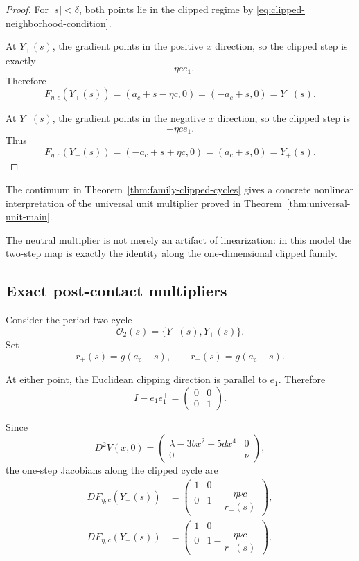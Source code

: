 \begin{proof}
For $|s|<\delta$,
both points lie in the clipped regime by
\eqref{eq:clipped-neighborhood-condition}.

At $Y_+(s)$, the gradient points in the positive $x$ direction, so
the clipped step is exactly
\[
-\eta c e_1.
\]
Therefore
\[
F_{\eta,c}(Y_+(s))
=
(a_c+s-\eta c,0)
=
(-a_c+s,0)
=
Y_-(s).
\]

At $Y_-(s)$, the gradient points in the negative $x$ direction, so
the clipped step is
\[
+\eta c e_1.
\]
Thus
\[
F_{\eta,c}(Y_-(s))
=
(-a_c+s+\eta c,0)
=
(a_c+s,0)
=
Y_+(s).
\]
\end{proof}

\begin{remark}
\label{rem:family-unit-meaning}
The continuum in
Theorem~\ref{thm:family-clipped-cycles} gives a concrete nonlinear
interpretation of the universal unit multiplier proved in
Theorem~\ref{thm:universal-unit-main}.

The neutral multiplier is not merely an artifact of linearization:
in this model the two-step map is exactly the identity along the
one-dimensional clipped family.
\end{remark}

\subsection{Exact post-contact multipliers}
\label{subsec:planar-post-multipliers}

Consider the period-two cycle
\[
\mathcal O_2(s)
=
\{Y_-(s),Y_+(s)\}.
\]
Set
\begin{equation}
r_+(s)
=
g(a_c+s),
\qquad
r_-(s)
=
g(a_c-s).
\label{eq:r-plus-minus}
\end{equation}

At either point, the Euclidean clipping direction is parallel to
$e_1$. Therefore
\begin{equation}
I-e_1e_1^\top
=
\begin{pmatrix}
0&0\\
0&1
\end{pmatrix}.
\label{eq:e1-projector}
\end{equation}

Since
\[
D^2V(x,0)
=
\begin{pmatrix}
\lambda-3bx^2+5dx^4&0
\\
0&\nu
\end{pmatrix},
\]
the one-step Jacobians along the clipped cycle are
\begin{align}
DF_{\eta,c}(Y_+(s))
&=
\begin{pmatrix}
1&0
\\
0&
1-\dfrac{\eta\nu c}{r_+(s)}
\end{pmatrix},
\label{eq:Jac-plus-family}
\\
DF_{\eta,c}(Y_-(s))
&=
\begin{pmatrix}
1&0
\\
0&
1-\dfrac{\eta\nu c}{r_-(s)}
\end{pmatrix}.
\label{eq:Jac-minus-family}
\end{align}

